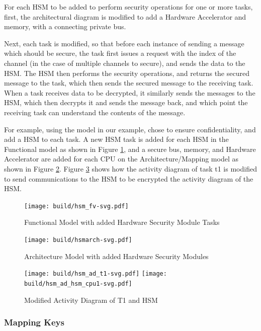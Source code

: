\documentclass[12pt]{article}
\begin{document}
For each HSM to be added to perform security operations for one or more tasks, first, the architectural diagram is modified to add a Hardware Accelerator and memory, with a connecting private bus.

Next, each task is modified, so that before each instance of sending a message which should be secure, the task first issues a request with the index of the channel (in the case of multiple channels to secure), and sends the data to the HSM. The HSM then performs the security operations, and returns the secured message to the task, which then sends the secured message to the receiving task. When a task receives data to be decrypted, it similarly sends the messages to the HSM, which then decrypts it and sends the message back, and which point the receiving task can understand the contents of the message.

For example, using the model in our example, chose to ensure confidentiality, and add a HSM to each task. A new HSM task is added for each HSM in the Functional model as shown in Figure \ref{fig:hsmfunc}, and a secure bus, memory, and Hardware Accelerator are added for each CPU on the Architecture/Mapping model as shown in Figure \ref{fig:hsmarch}. Figure \ref{fig:hsmt1act} shows how the activity diagram of task t1 is modified to send communications to the HSM to be encrypted the activity diagram of the HSM. 

\begin{figure}[htbp]
\centering
\texttt{[image: build/hsm\_fv-svg.pdf]}
\caption{Functional Model with added Hardware Security Module Tasks} \label{fig:hsmfunc}
\end{figure}


\begin{figure}[htbp]
\centering
\texttt{[image: build/hsmarch-svg.pdf]}
\caption{Architecture Model with added Hardware Security Modules} \label{fig:hsmarch}
\end{figure}


\begin{figure}[htbp]
\centering
\texttt{[image: build/hsm\_ad\_t1-svg.pdf]}
\texttt{[image: build/hsm\_ad\_hsm\_cpu1-svg.pdf]}
\caption{Modified Activity Diagram of T1 and HSM} \label{fig:hsmt1act}
\end{figure}




\subsubsection{Mapping Keys}
\end{document}
